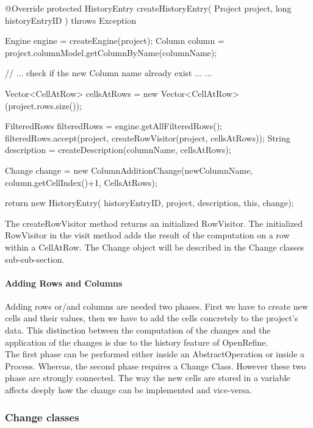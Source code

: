 \begin{code}
 @Override
protected HistoryEntry createHistoryEntry(
            Project project, long historyEntryID
            ) throws Exception {
   Engine engine = createEngine(project);
   Column column = 
      project.columnModel.getColumnByName(columnName);

   // ... check if the new Column name already exist ...
   ...

   Vector<CellAtRow> cellsAtRows = 
      new Vector<CellAtRow>(project.rows.size());

   FilteredRows filteredRows = engine.getAllFilteredRows();
   filteredRows.accept(project, 
                       createRowVisitor(project, cellsAtRows));
   String description = createDescription(columnName, 
                                          cellsAtRows);

   Change change = new ColumnAdditionChange(newColumnName, 
                            column.getCellIndex()+1, 
                            CellsAtRows);

   return new HistoryEntry(
         historyEntryID, project, description, this, change);
} 
\end{code}
The createRowVisitor method returns an initialized RowVisitor. The initialized RowVisitor in the visit method adds the result of the computation on a row within a CellAtRow. The Change object will be described in the Change classes sub-sub-section.

\paragraph{Adding Rows and Columns} Adding rows or/and columns are needed two phases. First we have to create new cells and their values, then we have to add the cells concretely to the project's data. This distinction between the computation of the changes and the application of the changes is due to the history feature of OpenRefine. \\
The first phase can be performed either inside an AbstractOperation or inside a Process. Whereas, the second phase requires a Change Class. However these two phase are strongly connected. The way the new cells are stored in a variable affects deeply how the change can be implemented and vice-versa. 

\subsubsection{Change classes}
